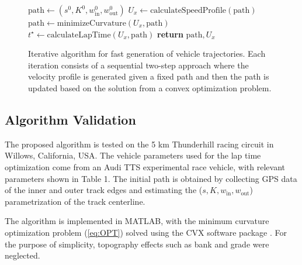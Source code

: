 \documentclass[twocolumn,10pt, final]{asme2e}
\begin{document}
\begin{figure}
\begin{algorithmic}[1]
\State $\mathrm{path}\gets (s^0, K^0, w_\mathrm{in}^0, w_\mathrm{out}^0)$
\State $U_x \gets \mathrm{calculateSpeedProfile(path)}$
\State $\mathrm{path} \gets \mathrm{minimizeCurvature}(U_x, \mathrm{path})$
\State $t^\star \gets \mathrm{calculateLapTime}(U_x,\mathrm{path})$
\EndWhile
\State \textbf{return} $\mathrm{path},U_x$
\EndProcedure
\end{algorithmic}
\caption{Iterative algorithm for fast generation of vehicle trajectories. Each iteration consists of a sequential two-step approach where
the velocity profile is generated given a fixed path and then the path is updated based on the solution from a convex optimization problem.}\label{algorithmDesc}
\end{figure}
\subsection*{Algorithm Validation}
The proposed algorithm is tested on the 5 km Thunderhill racing circuit in Willows, California, USA. The vehicle parameters 
used for the lap time optimization come from an Audi TTS experimental race vehicle, with relevant parameters shown in Table 1.
 The initial path is obtained by collecting GPS data of the inner and outer track edges and estimating the ($s, K, w_\mathrm{in}, w_\mathrm{out}$)
 parametrization of the track centerline.
 
The algorithm is implemented in MATLAB, with the minimum curvature optimization problem (\ref{eq:OPT}) solved using the CVX software package \cite{boydcvx}. For
the purpose of simplicity, topography effects such as bank and grade were neglected. 
\end{document}

